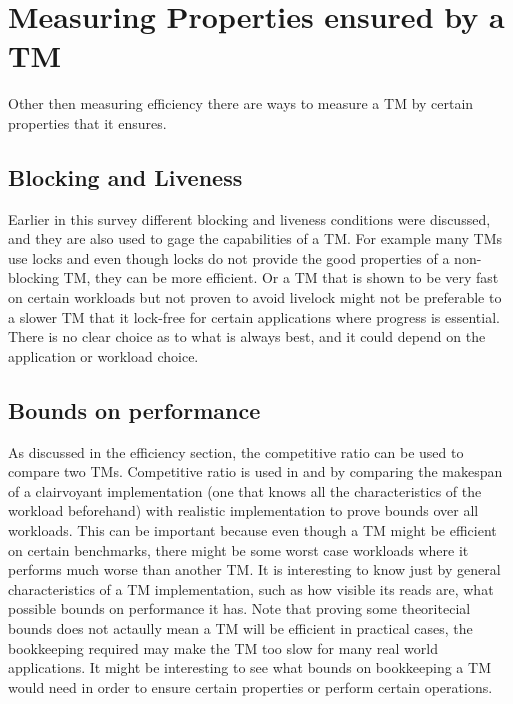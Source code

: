 \section{Measuring Properties ensured by a TM}
Other then measuring efficiency there are ways to measure a TM by certain properties that it ensures.

\subsection{Blocking and Liveness}
Earlier in this survey different blocking and liveness conditions were discussed, and they are also used to gage the capabilities of a TM.
For example many TMs use locks and even though locks do not provide the good properties of a non-blocking TM, they can be more efficient.
Or a TM that is shown to be very fast on certain workloads but not proven to avoid livelock might not be preferable to a slower TM that it lock-free for certain applications where progress is essential.
There is no clear choice as to what is always best, and it could depend on the application or workload choice.

\subsection{Bounds on performance}
As discussed in the efficiency section, the competitive ratio can be used to compare two TMs.
Competitive ratio is used in \cite{1696831} and \cite{1073863} by comparing the makespan of a clairvoyant implementation (one that knows all the characteristics of the workload beforehand) with realistic implementation to prove bounds over all workloads.
This can be important because even though a TM might be efficient on certain benchmarks, there might be some worst case workloads where it performs much worse than another TM.
It is interesting to know just by general characteristics of a TM implementation, such as how visible its reads are, what possible bounds on performance it has.
Note that proving some theoritecial bounds does not actaully mean a TM will be efficient in practical cases, the bookkeeping required may make the TM too slow for many real world applications.
It might be interesting to see what bounds on bookkeeping a TM would need in order to ensure certain properties or perform certain operations.

